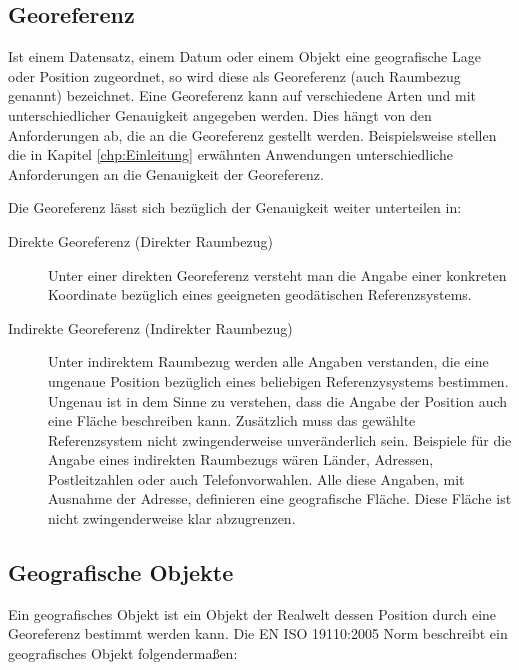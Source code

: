 		\subsection{Georeferenz} 
			
			Ist einem Datensatz, einem Datum oder einem Objekt eine geografische Lage oder Position zugeordnet, so wird diese als Georeferenz (auch Raumbezug genannt) bezeichnet.
			Eine Georeferenz kann auf verschiedene Arten und mit unterschiedlicher Genauigkeit angegeben werden.
			Dies hängt von den Anforderungen ab, die an die Georeferenz gestellt werden. 
			Beispielsweise stellen die in Kapitel \ref{chp:Einleitung} erwähnten Anwendungen unterschiedliche Anforderungen an die Genauigkeit der Georeferenz.  
			
			Die Georeferenz lässt sich bezüglich der Genauigkeit weiter unterteilen in: 
		
			\begin{description}

	 			\item[Direkte Georeferenz (Direkter Raumbezug)] 
	 				
	 				Unter einer direkten Georeferenz versteht man die Angabe einer konkreten Koordinate bezüglich eines geeigneten geodätischen Referenzsystems.  

	 			\item[Indirekte Georeferenz (Indirekter Raumbezug)] 
	 				
	 				Unter indirektem Raumbezug werden alle Angaben verstanden, die eine ungenaue Position bezüglich eines beliebigen Referenzysystems bestimmen.
		 			Ungenau ist in dem Sinne zu verstehen, dass die Angabe der Position auch eine Fläche beschreiben kann.
		 			Zusätzlich muss das gewählte Referenzsystem nicht zwingenderweise unveränderlich sein.   
		 			Beispiele für die Angabe eines indirekten Raumbezugs wären Länder, Adressen, Postleitzahlen oder auch Telefonvorwahlen. 
		 			Alle diese Angaben, mit Ausnahme der Adresse, definieren eine geografische Fläche. 
		 			Diese Fläche ist nicht zwingenderweise klar abzugrenzen.  

			\end{description}

		\subsection{Geografische Objekte}
			
			Ein geografisches Objekt ist ein Objekt der Realwelt dessen Position durch eine Georeferenz bestimmt werden kann. 
			Die EN ISO 19110:2005 Norm beschreibt ein geografisches Objekt folgendermaßen: 

